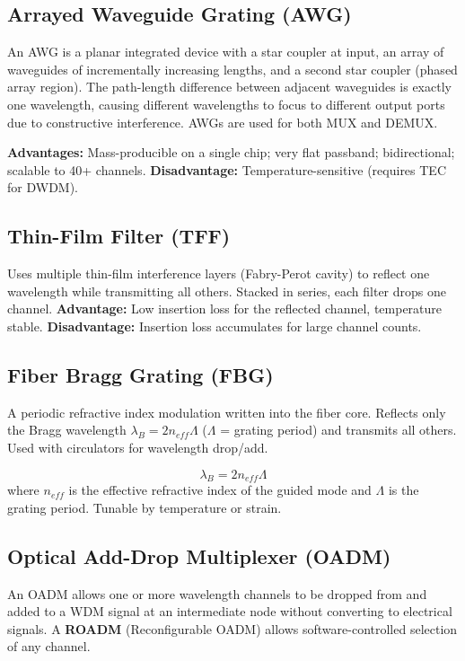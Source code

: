 \documentclass[12pt,a4paper]{article}
\begin{document}
\subsection{Arrayed Waveguide Grating (AWG)}
An AWG is a planar integrated device with a star coupler at input, an array of waveguides of incrementally increasing lengths, and a second star coupler (phased array region). The path-length difference between adjacent waveguides is exactly one wavelength, causing different wavelengths to focus to different output ports due to constructive interference. AWGs are used for both MUX and DEMUX.

\textbf{Advantages:} Mass-producible on a single chip; very flat passband; bidirectional; scalable to 40+ channels. \textbf{Disadvantage:} Temperature-sensitive (requires TEC for DWDM).

\subsection{Thin-Film Filter (TFF)}
Uses multiple thin-film interference layers (Fabry-Perot cavity) to reflect one wavelength while transmitting all others. Stacked in series, each filter drops one channel. \textbf{Advantage:} Low insertion loss for the reflected channel, temperature stable. \textbf{Disadvantage:} Insertion loss accumulates for large channel counts.

\subsection{Fiber Bragg Grating (FBG)}
A periodic refractive index modulation written into the fiber core. Reflects only the Bragg wavelength $\lambda_B = 2n_{eff}\Lambda$ ($\Lambda$ = grating period) and transmits all others. Used with circulators for wavelength drop/add.

\begin{tcolorbox}[formulabox, title={\textbf{FBG Bragg Condition}}]
\[
\lambda_B = 2 n_{eff} \Lambda
\]
where $n_{eff}$ is the effective refractive index of the guided mode and $\Lambda$ is the grating period. Tunable by temperature or strain.
\end{tcolorbox}

\subsection{Optical Add-Drop Multiplexer (OADM)}
An OADM allows one or more wavelength channels to be dropped from and added to a WDM signal at an intermediate node without converting to electrical signals. A \textbf{ROADM} (Reconfigurable OADM) allows software-controlled selection of any channel.
\end{document}
